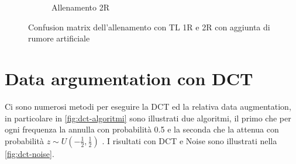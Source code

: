 \begin{figure}[ht]
\begin{subfigure}{0.45\textwidth}
        \caption{Allenamento 2R} 
    \end{subfigure}
    \caption{Confusion matrix dell'allenamento con TL 1R e 2R con aggiunta di rumore artificiale}
    \label{fig:noise}
\end{figure}

\section{Data argumentation con DCT}\label{data-argumentation-con-dct}

Ci sono numerosi metodi per eseguire la DCT ed la relativa data augmentation, in particolare in \cref{fig:dct-algoritmi} sono illustrati due algoritmi, il primo che per ogni frequenza la annulla con probabilità 0.5 e la seconda che la attenua con probabilità \(z\sim U\left(-\frac{1}{2}, \frac{1}{2}\right)\) \cite{nanni_dct_pca}. I risultati con DCT e Noise sono illustrati nella \cref{fig:dct-noise}.


